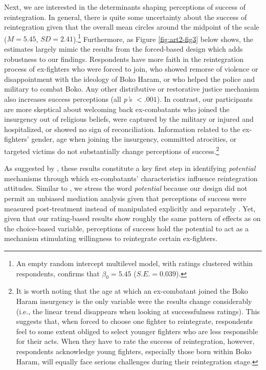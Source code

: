 Next, we are interested in the determinants shaping perceptions of success of reintegration. In general, there is quite some uncertainty about the success of reintegration given that the overall mean circles around the midpoint of the scale ($M = 5.45$, $SD = 2.41$).\footnote{An empty random intercept multilevel model, with ratings clustered within respondents, confirms that $\beta_0 = 5.45$ ($S.E.=0.039$).} Furthermore, as Figure \ref{fig:art2-fig3} below shows, the estimates largely mimic the results from the forced-based design which adds robustness to our findings. Respondents have more faith in the reintegration process of ex-fighters who were forced to join, who showed remorse of violence or disappointment with the ideology of Boko Haram, or who helped the police and military to combat Boko. Any other distributive or restorative justice mechanism also increases success perceptions (all \textit{p'}s\textit{ }$\mathrm{<} .001$). In contrast, our participants are more skeptical about welcoming back ex-combatants who joined the insurgency out of religious beliefs, were captured by the military or injured and hospitalized, or showed no sign of reconciliation. Information related to the ex-fighters' gender, age when joining the insurgency, committed atrocities, or targeted victims do not substantially change perceptions of success.\footnote{It is worth noting that the age at which an ex-combatant joined the Boko Haram insurgency is the only variable were the results change considerably (i.e., the linear trend disappears when looking at successfulness ratings). This suggests that, when forced to choose one fighter to reintegrate, respondents feel to some extent obliged to select younger fighters who are less responsible for their acts. When they have to rate the success of reintegration, however, respondents acknowledge young fighters, especially those born within Boko Haram, will equally face serious challenges during their reintegration stage.} 

As suggested by \cite{Johns2019}, these results constitute a key first step in identifying \textit{potential} mechanisms through which ex-combatants' characteristics influence reintegration attitudes. Similar to \cite{Johns2019}, we stress the word \textit{potential} because our design did not permit an unbiased mediation analysis given that perceptions of success were measured post-treatment instead of manipulated explicitly and separately \citep{Bullock2011}. Yet, given that our rating-based results show roughly the same pattern of effects as on the choice-based variable, perceptions of success hold the potential to act as a mechanism stimulating willingness to reintegrate certain ex-fighters.

